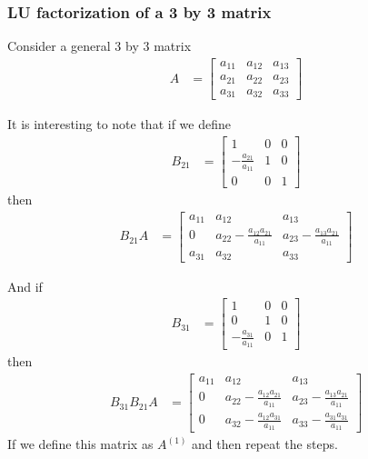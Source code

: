 \subsubsection{LU factorization of a 3 by 3 matrix}

Consider a general 3 by 3 matrix
\begin{align*}
A & = \begin{bmatrix}
a_{11} & a_{12} & a_{13} \\
a_{21} & a_{22} & a_{23} \\
a_{31} & a_{32} & a_{33} 
\end{bmatrix}
\end{align*}

It is interesting to note that if we define 
\begin{align*}
B_{21} & = \begin{bmatrix}
1 & 0 & 0 \\[4pt]
-\frac{a_{21}}{a_{11}} & 1 & 0 \\[4pt]
0 & 0 & 1
\end{bmatrix}
\end{align*}
then 
\begin{align*}
B_{21} A & = \begin{bmatrix}
a_{11} & a_{12} & a_{13} \\[4pt]
0 & a_{22} - \frac{a_{12}a_{21}}{a_{11}} & a_{23}- \frac{a_{13}a_{21}}{a_{11}} \\[4pt]
a_{31} & a_{32} & a_{33} 
\end{bmatrix}
\end{align*}

And if 
\begin{align*}
B_{31} & = \begin{bmatrix}
1 & 0 & 0 \\[4pt]
0 & 1 & 0 \\[4pt]
-\frac{a_{31}}{a_{11}} & 0 & 1
\end{bmatrix}
\end{align*}
then 
\begin{align*}
B_{31} B_{21} A & = 
\begin{bmatrix}
a_{11} & a_{12} & a_{13} \\[4pt]
0 & a_{22} - \frac{a_{12}a_{21}}{a_{11}} & a_{23}- \frac{a_{13}a_{21}}{a_{11}} \\[4pt]
0 & a_{32} - \frac{a_{12}a_{31}}{a_{11}} & a_{33} - \frac{a_{31}a_{31}}{a_{11}} 
\end{bmatrix}
\end{align*}
If we define this matrix as $A^{(1)}$ and then repeat the steps. 

